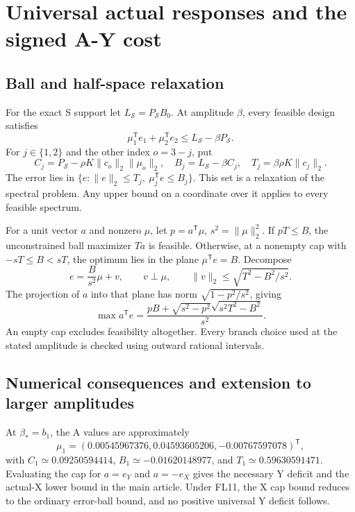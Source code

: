 \documentclass[9pt]{osa-supplemental-document}
\begin{document}
\section{Universal actual responses and the signed A-Y cost}
\subsection{Ball and half-space relaxation}
For the exact S support let $L_{\mathcal S}=P_{\mathcal S}B_0$. At amplitude $\beta$, every feasible design satisfies
\begin{equation}
 \mu_1^{\mathsf T}e_1+\mu_2^{\mathsf T}e_2\leq L_{\mathcal S}-\beta P_{\mathcal S}.
\end{equation}
For $j\in\{1,2\}$ and the other index $o=3-j$, put
\begin{equation}
 C_j=P_{\mathcal S}-\rho K\|c_o\|_2\|\mu_o\|_2,
 \quad B_j=L_{\mathcal S}-\beta C_j,
 \quad T_j=\beta\rho K\|c_j\|_2.
\end{equation}
The error lies in $\{e:\|e\|_2\leq T_j,\ \mu_j^{\mathsf T}e\leq B_j\}$. This set is a relaxation of the spectral problem. Any upper bound on a coordinate over it applies to every feasible spectrum.

For a unit vector $a$ and nonzero $\mu$, let $p=a^{\mathsf T}\mu$, $s^2=\|\mu\|_2^2$. If $pT\leq B$, the unconstrained ball maximizer $Ta$ is feasible. Otherwise, at a nonempty cap with $-sT\leq B<sT$, the optimum lies in the plane $\mu^{\mathsf T}e=B$. Decompose
\begin{equation}
 e=\frac{B}{s^2}\mu+v,\qquad v\perp\mu,\qquad
 \|v\|_2\leq\sqrt{T^2-B^2/s^2}.
\end{equation}
The projection of $a$ into that plane has norm $\sqrt{1-p^2/s^2}$, giving
\begin{equation}
 \max a^{\mathsf T}e=\frac{pB+\sqrt{s^2-p^2}\sqrt{s^2T^2-B^2}}{s^2}.
\end{equation}
An empty cap excludes feasibility altogether. Every branch choice used at the stated amplitude is checked using outward rational intervals.

\subsection{Numerical consequences and extension to larger amplitudes}
At $\beta_*=b_1$, the A values are approximately
\begin{equation}
 \mu_1=(0.00545967376,0.04593605206,-0.00767597078)^{\mathsf T},
\end{equation}
with $C_1\simeq0.09250594414$, $B_1\simeq-0.01620148977$, and $T_1\simeq0.59630591471$. Evaluating the cap for $a=e_Y$ and $a=-e_X$ gives the necessary Y deficit and the actual-X lower bound in the main article. Under FL11, the X cap bound reduces to the ordinary error-ball bound, and no positive universal Y deficit follows.
\end{document}

